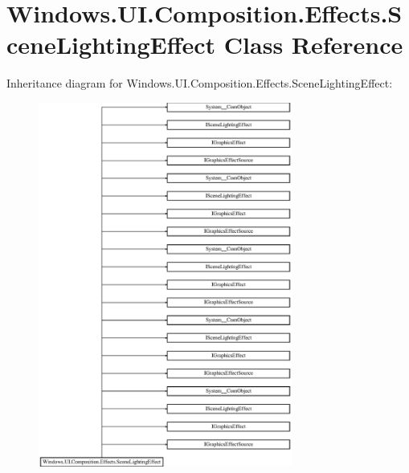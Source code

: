 \hypertarget{class_windows_1_1_u_i_1_1_composition_1_1_effects_1_1_scene_lighting_effect}{}\section{Windows.\+U\+I.\+Composition.\+Effects.\+Scene\+Lighting\+Effect Class Reference}
\label{class_windows_1_1_u_i_1_1_composition_1_1_effects_1_1_scene_lighting_effect}
Inheritance diagram for Windows.\+U\+I.\+Composition.\+Effects.\+Scene\+Lighting\+Effect\+:\begin{figure}[H]
\begin{center}
\leavevmode
\includegraphics[height=12.000000cm]{class_windows_1_1_u_i_1_1_composition_1_1_effects_1_1_scene_lighting_effect}
\end{center}
\end{figure}
